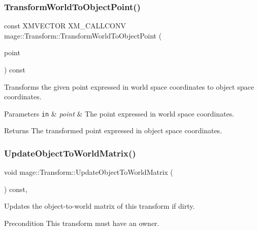 \subsubsection{\texorpdfstring{Transform\+World\+To\+Object\+Point()}{TransformWorldToObjectPoint()}}
{\footnotesize\ttfamily const X\+M\+V\+E\+C\+T\+OR X\+M\+\_\+\+C\+A\+L\+L\+C\+O\+NV mage\+::\+Transform\+::\+Transform\+World\+To\+Object\+Point (\begin{DoxyParamCaption}\item[{F\+X\+M\+V\+E\+C\+T\+OR}]{point }\end{DoxyParamCaption}) const\hspace{0.3cm}{\ttfamily [noexcept]}}

Transforms the given point expressed in world space coordinates to object space coordinates.


\begin{DoxyParams}[1]{Parameters}
\mbox{\tt in}  & {\em point} & The point expressed in world space coordinates. \\
\hline
\end{DoxyParams}
\begin{DoxyReturn}{Returns}
The transformed point expressed in object space coordinates. 
\end{DoxyReturn}
\hypertarget{classmage_1_1_transform_a237fb0afa443909983e83f2e3863f4dd}{}\label{classmage_1_1_transform_a237fb0afa443909983e83f2e3863f4dd} 
\subsubsection{\texorpdfstring{Update\+Object\+To\+World\+Matrix()}{UpdateObjectToWorldMatrix()}}
{\footnotesize\ttfamily void mage\+::\+Transform\+::\+Update\+Object\+To\+World\+Matrix (\begin{DoxyParamCaption}{ }\end{DoxyParamCaption}) const\hspace{0.3cm}{\ttfamily [private]}, {\ttfamily [noexcept]}}

Updates the object-\/to-\/world matrix of this transform if dirty.

\begin{DoxyPrecond}{Precondition}
This transform must have an owner. 
\end{DoxyPrecond}
\hypertarget{classmage_1_1_transform_a0cdac8ab1ae9570e6829fd88365df031}{}\label{classmage_1_1_transform_a0cdac8ab1ae9570e6829fd88365df031} 
